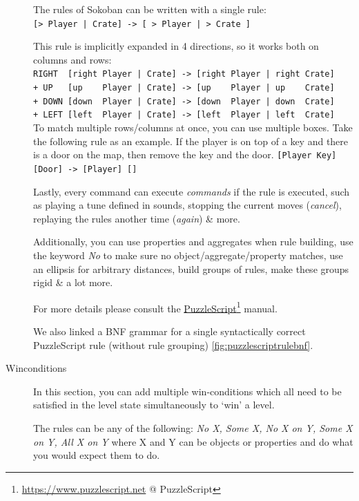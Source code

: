 \begin{description}
        The rules of Sokoban can be written with a single rule: \hfill \\
        \lstinline{[> Player | Crate] -> [ > Player | > Crate ]}
        
        This rule is implicitly expanded in 4 directions, so it works both on columns and rows:\hfill \\
        \lstinline{RIGHT  [right Player | Crate] -> [right Player | right Crate]}\hfill \\
        \lstinline{+ UP   [up    Player | Crate] -> [up    Player | up    Crate]}\hfill \\
        \lstinline{+ DOWN [down  Player | Crate] -> [down  Player | down  Crate]}\hfill \\
        \lstinline{+ LEFT [left  Player | Crate] -> [left  Player | left  Crate]}\hfill \\
        
        To match multiple rows/columns at once, you can use multiple boxes. Take the following rule as an example. If the player is on top of a key and there is a door on the map, then remove the key and the door.
    \lstinline{[Player Key] [Door] -> [Player] []}
    
        Lastly, every command can execute \textit{commands} if the rule is executed, such as playing a tune defined in sounds, stopping the current moves (\textit{cancel}), replaying the rules another time (\textit{again}) \& more.
        
        Additionally, you can use properties and aggregates when rule building, use the keyword \textit{No} to make sure no object/aggregate/property matches, use an ellipsis for arbitrary distances, build groups of rules, make these groups rigid \& a lot more.
        
        For more details please consult the \href{https://www.puzzlescript.net}{PuzzleScript}\footnote{\url{https://www.puzzlescript.net} @ PuzzleScript} manual.
        
        We also linked a BNF grammar for a single syntactically correct PuzzleScript rule (without rule grouping) \ref{fig:puzzlescriptrulebnf}.
    
    \item [Winconditions] In this section, you can add multiple win-conditions which all need to be satisfied in the level state simultaneously to `win' a level.
    
    The rules can be any of the following: \textit{No X, Some X, No X on Y, Some X on Y, All X on Y} where X and Y can be objects or properties and do what you would expect them to do.
    

\end{description}
